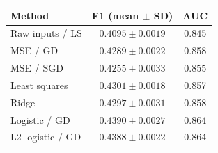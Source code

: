 \begin{tabular}{@{}lcc@{}}
\toprule
Method & F1 (mean $\pm$ SD) & AUC\\
\midrule
Raw inputs / LS & $0.4095 \pm 0.0019$ & 0.845 \\
MSE / GD & $0.4289 \pm 0.0022$ & 0.858 \\
MSE / SGD & $0.4255 \pm 0.0033$ & 0.855 \\
Least squares & $0.4301 \pm 0.0018$ & 0.857 \\
Ridge & $0.4297 \pm 0.0031$ & 0.858 \\
Logistic / GD & $\mathbf{0.4390} \pm 0.0027$ & 0.864 \\
L2 logistic / GD & $0.4388 \pm 0.0022$ & 0.864 \\
\bottomrule
\end{tabular}
